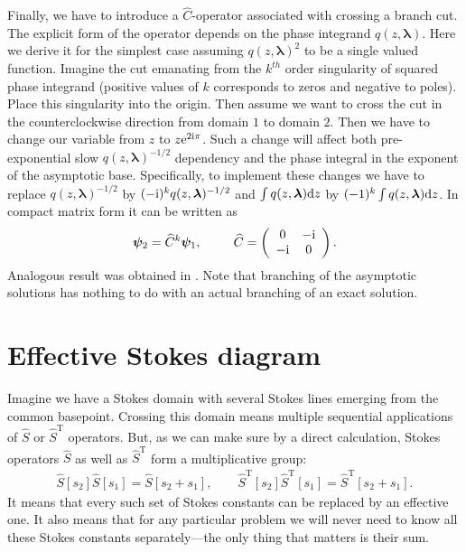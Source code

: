 \documentclass[12pt]{iopart}
\def\S{\widehat{S}}
\def\C{\widehat{C}}
\def\psii{\bm\psi}
\def\lmbd{\bm{\lambda}}
\def\Tp{\mathrm{T}}
\newcommand\phsintgrnd[1][z]{q(#1,\lmbd)}
\newcommand\predexp[1][z]{q(#1,\lmbd)^{-1/2}}
\begin{document}
Finally, we have to introduce a $\C$-operator associated with crossing a branch cut. The explicit form 
of the operator depends on the phase integrand $\phsintgrnd$. Here we derive it for the simplest case  
assuming $\phsintgrnd^2$ to be a single valued function. Imagine the cut emanating from the $k^{th}$ order
singularity of squared phase integrand (positive values of $k$ corresponds to zeros and negative to poles). 
Place this singularity into the origin. Then assume we want to cross the cut in the counterclockwise  
direction from domain $1$ to domain $2$. Then we have to change our variable 
from $z$ to $z \mathrm{e}^{2\mathrm{i}\pi}$. Such a change will affect both pre-exponential 
slow $\predexp$ dependency and the phase integral in the exponent of the asymptotic 
base. Specifically, to implement these changes we have to replace $\predexp$ by $(-\rmi)^k \predexp$ 
and $\int \phsintgrnd \rmd z$ by $(-1)^k \int \phsintgrnd \rmd z$. In compact matrix form 
it can be written as
\begin{eqnarray}
\psii_2 = \C^k \psii_1, \qquad
\C =  \left(\begin{array}{*{2}{c}} 0 & -\rmi \\ -\rmi & 0 \end{array}\right).    \label{eq:C}
\end{eqnarray}
Analogous result was obtained in \cite{frbook}. Note that branching of the asymptotic solutions has nothing to do with an actual branching  of  an exact solution.

\section{Effective Stokes diagram \label{sec:effsd}}
Imagine we have a Stokes domain with several Stokes lines emerging from the common basepoint.
Crossing this domain means multiple sequential applications of $\S$ or $\S^{\Tp}$ operators. But, as we
can make sure by a direct calculation, Stokes operators $\S$ as well as $\S^{\Tp}$ form a multiplicative
group:
\begin{eqnarray}
\S[s_2]\S[s_1] = \S[s_2 + s_1], \qquad
\S^{\Tp}[s_2]\S^{\Tp}[s_1] = \S^{\Tp}[s_2 + s_1].
\end{eqnarray}
It means that every such set of Stokes constants can be replaced by an effective one. It also means that
for any particular problem we will never need to know all these Stokes constants separately---the only
thing that matters is their sum.
\end{document}
